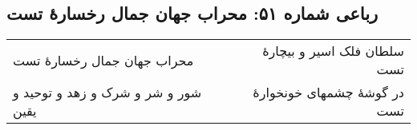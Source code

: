 \begin{center}
\section*{رباعی شماره ۵۱: محراب جهان جمال رخسارهٔ تست}
\label{sec:sh051}
\begin{longtable}{l p{0.5cm} r}
محراب جهان جمال رخسارهٔ تست
&&
سلطان فلک اسیر و بیچارهٔ تست
\\
شور و شر و شرک و زهد و توحید و یقین
&&
در گوشهٔ چشمهای خونخوارهٔ تست
\\
\end{longtable}
\end{center}
